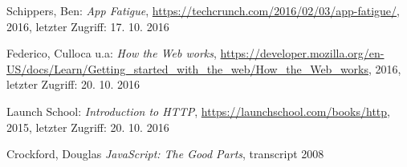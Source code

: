 \begin{thebibliography}{}
Schippers, Ben: 
\emph{App Fatigue}, 
\url{https://techcrunch.com/2016/02/03/app-fatigue/}, 2016, letzter Zugriff: 17. 10. 2016

Federico, Culloca u.a:
\emph{How the Web works}, 
\url{https://developer.mozilla.org/en-US/docs/Learn/Getting_started_with_the_web/How_the_Web_works}, 2016, letzter Zugriff: 20. 10. 2016

Launch School: 
\emph{Introduction to HTTP}, 
\url{https://launchschool.com/books/http}, 2015, letzter Zugriff: 20. 10. 2016

Crockford, Douglas 
\emph{JavaScript: The Good Parts}, transcript 2008

\end{thebibliography}